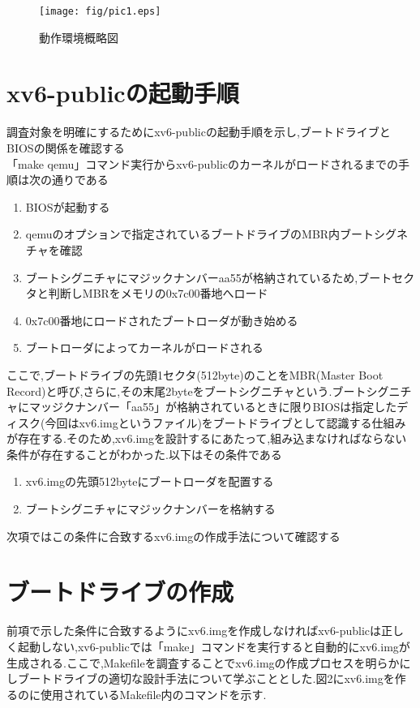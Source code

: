 \documentclass[submit,techreq,noauthor]{eco}	%
\begin{document}
\begin{figure}[H]
	\centering
	\texttt{[image: fig/pic1.eps]}
	\caption{動作環境概略図}
	\label{sample}
\end{figure}

\section{xv6-publicの起動手順}
調査対象を明確にするためにxv6-publicの起動手順を示し,ブートドライブとBIOSの関係を確認する\\
「make qemu」コマンド実行からxv6-publicのカーネルがロードされるまでの手順は次の通りである

\begin{enumerate}
	\renewcommand{\labelenumi}{\arabic{enumi}).}
	\item BIOSが起動する
	\item qemuのオプションで指定されているブートドライブのMBR内ブートシグネチャを確認
	\item ブートシグニチャにマジックナンバーaa55が格納されているため,ブートセクタと判断しMBRをメモリの0x7c00番地へロード
	\item 0x7c00番地にロードされたブートローダが動き始める
	\item ブートローダによってカーネルがロードされる
\end{enumerate}

ここで,ブートドライブの先頭1セクタ(512byte)のことをMBR(Master Boot Record)と呼び,さらに,その末尾2byteをブートシグニチャという.ブートシグニチャにマッジクナンバー「aa55」が格納されているときに限りBIOSは指定したディスク(今回はxv6.imgというファイル)をブートドライブとして認識する仕組みが存在する.そのため,xv6.imgを設計するにあたって,組み込まなければならない条件が存在することがわかった.以下はその条件である

\begin{enumerate}
	\renewcommand{\labelenumi}{\arabic{enumi}).}
	\item xv6.imgの先頭512byteにブートローダを配置する
	\item ブートシグニチャにマジックナンバーを格納する
\end{enumerate}

次項ではこの条件に合致するxv6.imgの作成手法について確認する

\section{ブートドライブの作成}
前項で示した条件に合致するようにxv6.imgを作成しなければxv6-publicは正しく起動しない,xv6-publicでは「make」コマンドを実行すると自動的にxv6.imgが生成される.ここで,Makefileを調査することでxv6.imgの作成プロセスを明らかにしブートドライブの適切な設計手法について学ぶこととした.図2にxv6.imgを作るのに使用されているMakefile内のコマンドを示す.
\end{document}
